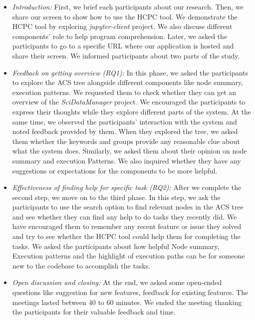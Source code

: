 \begin{itemize}
    \item \emph{Introduction:} First, we brief each participants about our research. Then, we share our screen to show how to use the HCPC tool. We demonstrate the HCPC tool by exploring \emph{jupyter-client} project. We also discuss different components' role to help program comprehension. Later, we asked the participants to go to a specific URL where our application is hosted and share their screen. We informed participants about two parts of the study.  
    
    \item \emph{Feedback on getting overview (RQ1):} In this phase, we asked the participants to explore the ACS tree alongside different components like node summary, execution patterns. We requested them to check whether they can get an  overview of the \emph{SciDataManager} project. We encouraged the participants to express their thoughts while they explore different parts of the system. At the same time, we observed the participants' interaction with the system and noted feedback provided by them. When they explored the tree, we asked them whether the keywords and groups provide any reasonable clue about what the system does. Similarly, we asked them about their opinion on node summary and execution Patterns. We also inquired whether they have any suggestions or expectations for the components to be more helpful.
    
    
    \item \emph{Effectiveness of finding help for specific task (RQ2):} After we complete the second step, we move on to the third phase. In this step, we ask the participants to use the search option to find relevant nodes in the ACS tree and see whether they can find any help to do tasks they recently did. We have encouraged them to remember any recent feature or issue they solved and try to see whether the HCPC tool could help them for completing the tasks. We asked the participants about how helpful Node summary, Execution patterns and the highlight of execution paths can be for someone new to the codebase to accomplish the tasks.
    \item \emph{Open discussion and closing:} At the end, we asked some open-ended questions like suggestion for new features, feedback for existing features. The meetings lasted between 40 to 60 minutes. We ended the meeting thanking the participants for their valuable feedback and time.

\end{itemize}
